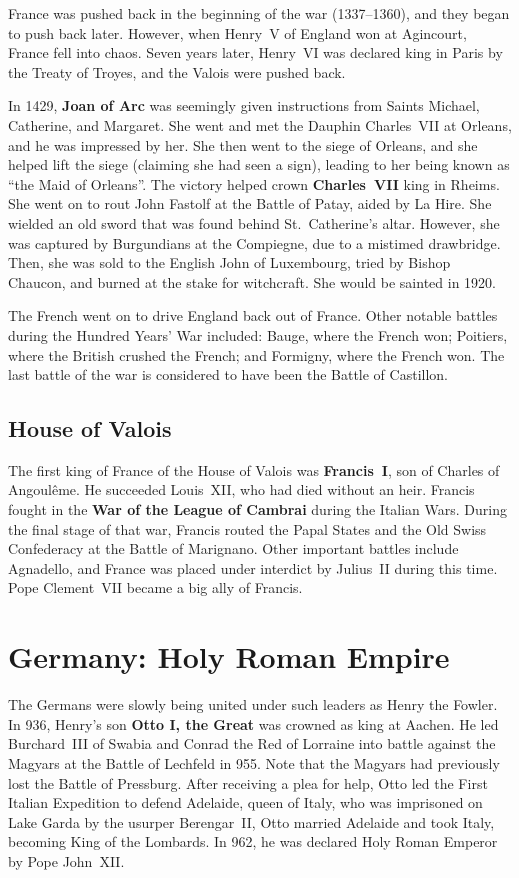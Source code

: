 France was pushed back in the beginning of the war (1337--1360), and they began to push back later.
However, when Henry~V of England won at Agincourt, France fell into chaos.
Seven years later, Henry~VI was declared king in Paris by the Treaty of Troyes, and the Valois were pushed back.

In 1429, \textbf{Joan of Arc} was seemingly given instructions from Saints Michael, Catherine, and Margaret.
She went and met the Dauphin Charles~VII at Orleans, and he was impressed by her.
She then went to the siege of Orleans, and she helped lift the siege (claiming she had seen a sign),
leading to her being known as ``the Maid of Orleans''.
The victory helped crown \textbf{Charles~VII} king in Rheims.
She went on to rout John Fastolf at the Battle of Patay, aided by La Hire.
She wielded an old sword that was found behind St.\ Catherine's altar.
However, she was captured by Burgundians at the Compiegne, due to a mistimed drawbridge.
Then, she was sold to the English John of Luxembourg, tried by Bishop Chaucon, and burned at the stake for witchcraft.
She would be sainted in 1920.

The French went on to drive England back out of France.
Other notable battles during the Hundred Years' War included:
Bauge, where the French won;
Poitiers, where the British crushed the French;
and Formigny, where the French won.
The last battle of the war is considered to have been the Battle of Castillon.

\subsection*{House of Valois}

The first king of France of the House of Valois was \textbf{Francis~I}, son of Charles of Angoul\^eme.
He succeeded Louis~XII, who had died without an heir.
Francis fought in the \textbf{War of the League of Cambrai} during the Italian Wars.
During the final stage of that war, Francis routed the Papal States and the Old Swiss Confederacy
at the Battle of Marignano.
Other important battles include Agnadello, and France was placed under interdict by Julius~II during this time.
Pope Clement~VII became a big ally of Francis.

\section{Germany: Holy Roman Empire}

The Germans were slowly being united under such leaders as Henry the Fowler.
In 936, Henry's son \textbf{Otto I, the Great} was crowned as king at Aachen.
He led Burchard~III of Swabia and Conrad the Red of Lorraine into battle
against the Magyars at the Battle of Lechfeld in 955.
Note that the Magyars had previously lost the Battle of Pressburg.
After receiving a plea for help, Otto led the First Italian Expedition to defend Adelaide, queen of Italy,
who was imprisoned on Lake Garda by the usurper Berengar~II,
Otto married Adelaide and took Italy, becoming King of the Lombards.
In 962, he was declared Holy Roman Emperor by Pope John~XII\@.

